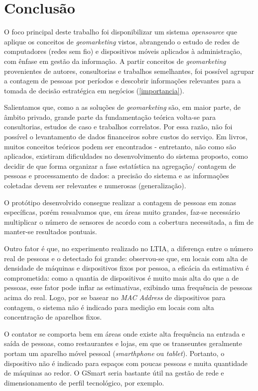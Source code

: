 \chapter{Conclusão}
\label{conclusao}


O foco principal deste trabalho foi disponibilizar um sistema \emph{opensource}
que aplique os conceitos de \emph{geomarketing} vistos, abrangendo o estudo de
redes de computadores (redes sem fio) e dispositivos móveis aplicados à
administração, com ênfase em gestão da informação. A partir conceitos de
\emph{geomarketing} provenientes de autores, consultorias e trabalhos
semelhantes, foi possível agrupar a contagem de pessoas por períodos e descobrir
informações relevantes para a tomada de decisão estratégica em negócios
(\autoref{importancia}).

Salientamos que, como a as soluções de \emph{geomarketing}
são, em maior parte, de âmbito privado, grande parte da fundamentação teórica
volta-se para consultorias, estudos de caso e trabalhos correlatos. Por essa
razão, não foi possível o levantamento de dados financeiros sobre custos do serviço. Em livros, muitos conceitos teóricos podem ser encontrados -
entretanto, não como são aplicados, existiram dificuldades no desenvolvimento do
sistema proposto, como decidir de que forma organizar a fase estatística na
agregação/ contagem de pessoas e processamento de dados: a precisão do sistema e
as informações coletadas devem ser relevantes e numerosas (generalização).

O protótipo desenvolvido consegue realizar a contagem de pessoas em zonas
específicas, porém ressalvamos que, em áreas muito grandes, faz-se necessário
multiplicar o número de sensores de acordo com a cobertura necessitada, a fim de
manter-se resultados pontuais. 

Outro fator é que, no experimento realizado no LTIA, a diferença entre o número real de pessoas e o detectado foi grande:  observou-se que, em locais com alta de densidade de máquinas e dispositivos fixos por pessoa, a eficácia da estimativa é comprometida: como a quantia de dispositivos é muito mais alta do que a de pessoas, esse fator pode inflar as estimativas, exibindo uma frequência de
pessoas acima do real. Logo, por se basear no \emph{MAC Address} de dispositivos
para contagem, o sistema não é indicado para medição em locais com alta
concentração de aparelhos fixos. 

O contator se comporta bem em áreas onde existe alta frequência na entrada e saída de pessoas, como
restaurantes e lojas, em que os transeuntes geralmente portam um aparelho móvel
pessoal (\emph{smarthphone} ou \emph{tablet}). Portanto, o dispositivo não é indicado para espaços com poucas pessoas e muita quantidade de máquinas ao redor. O GSmart seria bastante útil na gestão de rede e dimensionamento de perfil tecnológico, por exemplo.

